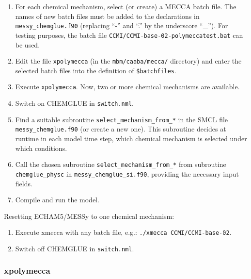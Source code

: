 \documentclass[a4paper,twoside]{article}
\newcommand{\IT}[1]{#1\index{#1}}
\begin{document}
\begin{enumerate}
\item For each chemical mechanism, select (or create) a MECCA batch
  file. The names of new batch files must be added to the declarations
  in \verb|messy_chemglue.f90| (replacing ``-'' and ``.'' by the
  underscore ``\_''). For testing purposes, the batch file
  \verb|CCMI/CCMI-base-02-polymeccatest.bat| can be used.
\item Edit the file \verb|xpolymecca| (in the \verb|mbm/caaba/mecca/|
  directory) and enter the selected batch files into the definition of
  \verb|$batchfiles|.
\item Execute \verb|xpolymecca|. Now, two or more chemical mechanisms
  are available.
\item Switch on CHEMGLUE in \verb|switch.nml|.
\item Find a suitable subroutine \verb|select_mechanism_from_*| in the
  SMCL file \verb|messy_chemglue.f90| (or create a new one). This
  subroutine decides at runtime in each model time step, which chemical
  mechanism is selected under which conditions.
\item Call the chosen subroutine \verb|select_mechanism_from_*| from
  subroutine \verb|chemglue_physc| in \verb|messy_chemglue_si.f90|,
  providing the necessary input fields.
\item Compile and run the model.
\end{enumerate}

Resetting ECHAM5/MESSy to one chemical mechanism:

\begin{enumerate}
\item Execute xmecca with any batch file, e.g.:
  \verb|./xmecca CCMI/CCMI-base-02|.
\item Switch off CHEMGLUE in \verb|switch.nml|.
\end{enumerate}

\subsubsection{\IT{xpolymecca}}
\end{document}
